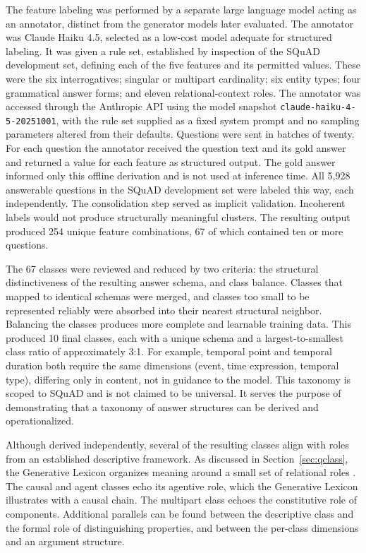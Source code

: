 \documentclass[master]{thesis}
\newcommand{\sref}[1]{Section~\ref{#1}}  %
\begin{document}
The feature labeling was performed by a separate large language model acting as an annotator, distinct from the generator models later evaluated. The annotator was Claude Haiku 4.5, selected as a low-cost model adequate for structured labeling. It was given a rule set, established by inspection of the SQuAD development set, defining each of the five features and its permitted values. These were the six interrogatives; singular or multipart cardinality; six entity types; four grammatical answer forms; and eleven relational-context roles. The annotator was accessed through the Anthropic API using the model snapshot \texttt{claude-haiku-4-5-20251001}, with the rule set supplied as a fixed system prompt and no sampling parameters altered from their defaults. Questions were sent in batches of twenty. For each question the annotator received the question text and its gold answer and returned a value for each feature as structured output. The gold answer informed only this offline derivation and is not used at inference time. All 5,928 answerable questions in the SQuAD development set were labeled this way, each independently. The consolidation step served as implicit validation. Incoherent labels would not produce structurally meaningful clusters. The resulting output produced 254 unique feature combinations, 67 of which contained ten or more questions.

The 67 classes were reviewed and reduced by two criteria: the structural distinctiveness of the resulting answer schema, and class balance. Classes that mapped to identical schemas were merged, and classes too small to be represented reliably were absorbed into their nearest structural neighbor. Balancing the classes produces more complete and learnable training data. This produced 10 final classes, each with a unique schema and a largest-to-smallest class ratio of approximately 3:1. For example, temporal point and temporal duration both require the same dimensions (event, time expression, temporal type), differing only in content, not in guidance to the model. This taxonomy is scoped to SQuAD and is not claimed to be universal. It serves the purpose of demonstrating that a taxonomy of answer structures can be derived and operationalized.

Although derived independently, several of the resulting classes align with roles from an established descriptive framework. As discussed in \sref{sec:qclass}, the Generative Lexicon organizes meaning around a small set of relational roles \cite{pustejovsky1991generative}. The causal and agent classes echo its agentive role, which the Generative Lexicon illustrates with a causal chain. The multipart class echoes the constitutive role of components. Additional parallels can be found between the descriptive class and the formal role of distinguishing properties, and between the per-class dimensions and an argument structure.
\end{document}
